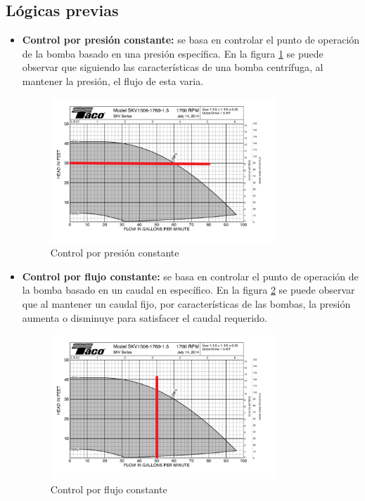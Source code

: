 \subsection{Lógicas previas}

\begin{itemize}
 \item \textbf{Control por presión constante:}
 se basa en controlar el punto de operación de la bomba basado en una presión específica. En la figura \ref{fig:CurvaControlTacoP} se puede observar que siguiendo las características de una bomba centrífuga, al  mantener la presión, el flujo de esta varia.
 
 \begin{figure}[H]
    \centering
    \includegraphics[width=0.80\textwidth]{2_MainMatter/Capitulo2/Imagenes/CurvacontrolTacoPconstante.png}
    \caption{Control por presión constante}
    \label{fig:CurvaControlTacoP}
\end{figure}

\item \textbf{Control por flujo constante:}
se basa en controlar el punto de operación de la bomba basado en un caudal en específico. En la figura \ref{fig:CurvaControlTacoQ} se puede observar que al mantener un caudal fijo, por características de las bombas, la presión aumenta o disminuye para satisfacer el caudal requerido.

 
 \begin{figure}[H]
    \centering
    \includegraphics[width=0.80\textwidth]{2_MainMatter/Capitulo2/Imagenes/CurvacontrolTacoQconstante.png}
    \caption{Control por flujo constante}
    \label{fig:CurvaControlTacoQ}
\end{figure}


\end{itemize}
